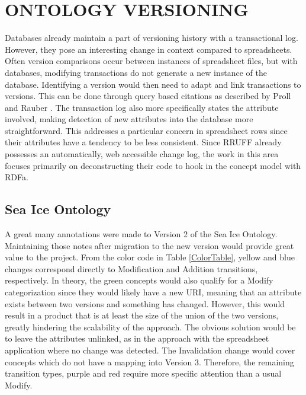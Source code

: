 
\chapter{ONTOLOGY VERSIONING}

Databases already maintain a part of versioning history with a transactional log.
However, they pose an interesting change in context compared to spreadsheets.
Often version comparisons occur between instances of spreadsheet files, but with databases, modifying transactions do not generate a new instance of the database.
Identifying a version would then need to adapt and link transactions to versions.
This can be done through query based citations as described by Proll and Rauber \cite{Proell2013}.
The transaction log also more specifically states the attribute involved, making detection of new attributes into the database more straightforward.
This addresses a particular concern in spreadsheet rows since their attributes have a tendency to be less consistent.
Since RRUFF already possesses an automatically, web accessible change log, the work in this area focuses primarily on deconstructing their code to hook in the concept model with RDFa.

\section{Sea Ice Ontology}

A great many annotations were made to Version 2 of the Sea Ice Ontology.
Maintaining those notes after migration to the new version would provide great value to the project.
From the color code in Table \ref{ColorTable}, yellow and blue changes correspond directly to Modification and Addition transitions, respectively.
In theory, the green concepts would also qualify for a Modify categorization since they would likely have a new URI, meaning that an attribute exists between two versions and something has changed.
However, this would result in a product that is at least the size of the union of the two versions, greatly hindering the scalability of the approach.
The obvious solution would be to leave the attributes unlinked, as in the approach with the spreadsheet application where no change was detected.
The Invalidation change would cover concepts which do not have a mapping into Version 3.
Therefore, the remaining transition types, purple and red require more specific attention than a usual Modify.

